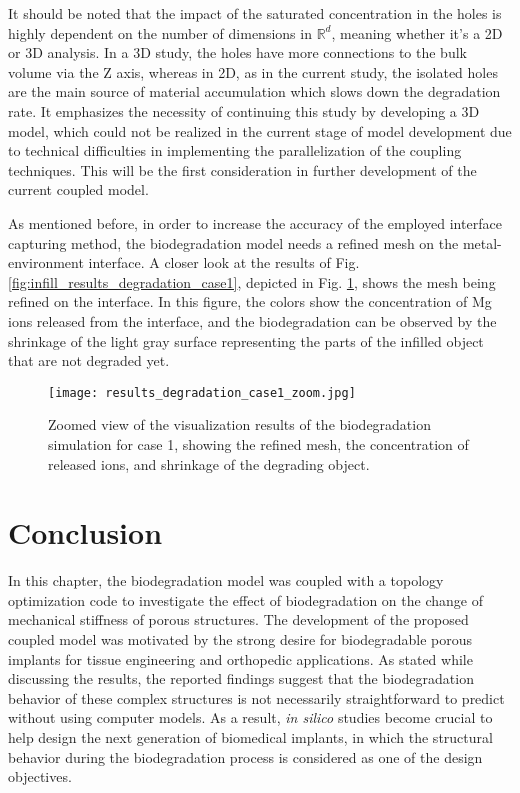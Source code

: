 It should be noted that the impact of the saturated concentration in the holes is highly dependent on the number of dimensions in $\mathbb{R}^d$, meaning whether it's a 2D or 3D analysis. In a 3D study, the holes have more connections to the bulk volume via the Z axis, whereas in 2D, as in the current study, the isolated holes are the main source of material accumulation which slows down the degradation rate. It emphasizes the necessity of continuing this study by developing a 3D model, which could not be realized in the current stage of model development due to technical difficulties in implementing the parallelization of the coupling techniques. This will be the first consideration in further development of the current coupled model.

As mentioned before, in order to increase the accuracy of the employed interface capturing method, the biodegradation model needs a refined mesh on the metal-environment interface. A closer look at the results of Fig. \ref{fig:infill_results_degradation_case1}, depicted in Fig. \ref{fig:infill_results_degradation_case1_zoom}, shows the mesh being refined on the interface. In this figure, the colors show the concentration of Mg ions released from the interface, and the biodegradation can be observed by the shrinkage of the light gray surface representing the parts of the infilled object that are not degraded yet.


\begin{figure}[h]
\centering
\medskip
\texttt{[image: results\_degradation\_case1\_zoom.jpg]}
\caption[Zoom view of the results of the biodegradation simulation for case 1]{Zoomed view of the visualization results of the biodegradation simulation for case 1, showing the refined mesh, the concentration of released ions, and shrinkage of the degrading object.} \label{fig:infill_results_degradation_case1_zoom}
\end{figure}

\section{Conclusion}

In this chapter, the biodegradation model was coupled with a topology optimization code to investigate the effect of biodegradation on the change of mechanical stiffness of porous structures. The development of the proposed coupled model was motivated by the strong desire for biodegradable porous implants for tissue engineering and orthopedic applications. As stated while discussing the results, the reported findings suggest that the biodegradation behavior of these complex structures is not necessarily straightforward to predict without using computer models. As a result, \textit{in silico} studies become crucial to help design the next generation of biomedical implants, in which the structural behavior during the biodegradation process is considered as one of the design objectives.

